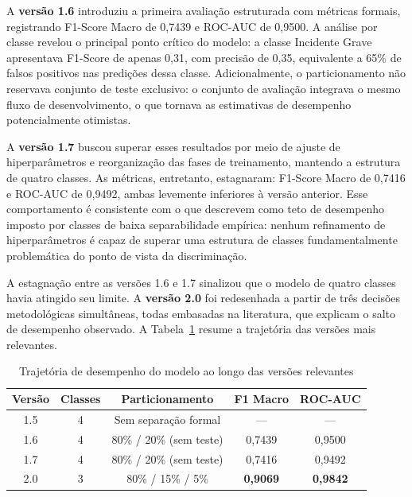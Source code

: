 \documentclass[english,brazilian]{UNISINOSartigo}
\begin{document}
A \textbf{versão 1.6} introduziu a primeira avaliação estruturada com métricas formais,
registrando F1-Score Macro de 0,7439 e ROC-AUC de 0,9500. A análise por classe revelou
o principal ponto crítico do modelo: a classe Incidente Grave apresentava F1-Score de
apenas 0,31, com precisão de 0,35, equivalente a 65\% de falsos positivos nas predições
dessa classe. Adicionalmente, o particionamento não reservava conjunto de teste exclusivo:
o conjunto de avaliação integrava o mesmo fluxo de desenvolvimento, o que tornava
as estimativas de desempenho potencialmente otimistas.

A \textbf{versão 1.7} buscou superar esses resultados por meio de ajuste de
hiperparâmetros e reorganização das fases de treinamento, mantendo a estrutura de quatro
classes. As métricas, entretanto, estagnaram: F1-Score Macro de 0,7416 e ROC-AUC de
0,9492, ambas levemente inferiores à versão anterior. Esse comportamento é consistente
com o que  descrevem como teto de desempenho imposto por
classes de baixa separabilidade empírica: nenhum refinamento de hiperparâmetros é
capaz de superar uma estrutura de classes fundamentalmente problemática do ponto de
vista da discriminação.

A estagnação entre as versões 1.6 e 1.7 sinalizou que o modelo de quatro classes havia
atingido seu limite. A \textbf{versão 2.0} foi redesenhada a partir de três decisões
metodológicas simultâneas, todas embasadas na literatura, que explicam o salto de
desempenho observado. A Tabela~\ref{tab:evolucao} resume a trajetória das versões
mais relevantes.

\begin{table}[ht]
  \caption{Trajetória de desempenho do modelo ao longo das versões relevantes}
  \label{tab:evolucao}
  \centering
  \begin{tabular}{ccccc}
    \toprule
    \textbf{Versão} & \textbf{Classes} & \textbf{Particionamento} & \textbf{F1 Macro} & \textbf{ROC-AUC} \\
    \midrule
    1.5 & 4 & Sem separação formal         & ---             & ---             \\
    1.6 & 4 & 80\% / 20\% (sem teste)      & 0,7439          & 0,9500          \\
    1.7 & 4 & 80\% / 20\% (sem teste)      & 0,7416          & 0,9492          \\
    2.0 & 3 & 80\% / 15\% / 5\%     & \textbf{0,9069} & \textbf{0,9842} \\
    \bottomrule
  \end{tabular}
\end{table}
\end{document}
